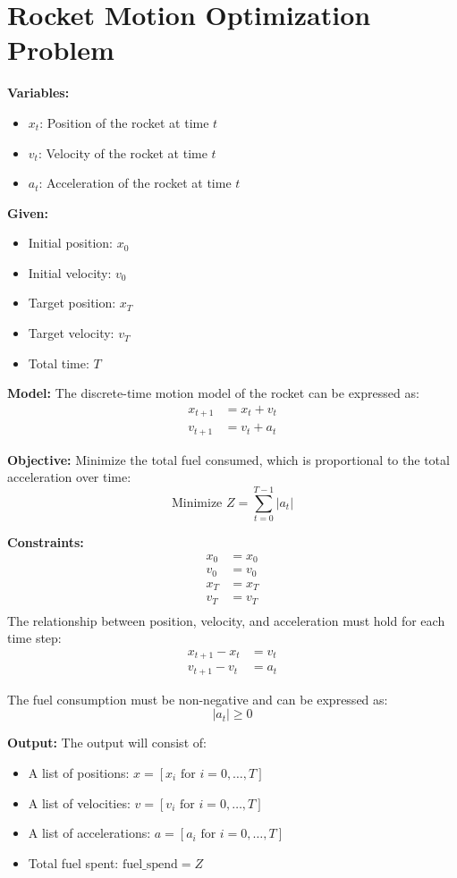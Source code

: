 \documentclass{article}
\begin{document}
\section*{Rocket Motion Optimization Problem}

\textbf{Variables:}
\begin{itemize}
    \item $x_t$: Position of the rocket at time $t$
    \item $v_t$: Velocity of the rocket at time $t$
    \item $a_t$: Acceleration of the rocket at time $t$
\end{itemize}

\textbf{Given:}
\begin{itemize}
    \item Initial position: $x_0$
    \item Initial velocity: $v_0$
    \item Target position: $x_T$
    \item Target velocity: $v_T$
    \item Total time: $T$
\end{itemize}

\textbf{Model:}
The discrete-time motion model of the rocket can be expressed as:
\[
\begin{align*}
x_{t+1} &= x_t + v_t \\
v_{t+1} &= v_t + a_t
\end{align*}
\]

\textbf{Objective:}
Minimize the total fuel consumed, which is proportional to the total acceleration over time:
\[
\text{Minimize } Z = \sum_{t=0}^{T-1} |a_t|
\]

\textbf{Constraints:}
\begin{align*}
x_0 &= x_0 \\
v_0 &= v_0 \\
x_T &= x_T \\
v_T &= v_T \\
\end{align*}
The relationship between position, velocity, and acceleration must hold for each time step:
\[
\begin{align*}
x_{t+1} - x_t &= v_t \\
v_{t+1} - v_t &= a_t
\end{align*}
\]

The fuel consumption must be non-negative and can be expressed as:
\[
|a_t| \geq 0
\]

\textbf{Output:}
The output will consist of:
\begin{itemize}
    \item A list of positions: $x = [x_i \text{ for } i = 0, \ldots, T]$
    \item A list of velocities: $v = [v_i \text{ for } i = 0, \ldots, T]$
    \item A list of accelerations: $a = [a_i \text{ for } i = 0, \ldots, T]$
    \item Total fuel spent: $\text{fuel\_spend} = Z$
\end{itemize}
\end{document}
